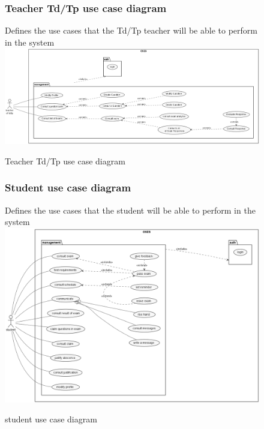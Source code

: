 \documentclass[]{uc2pfecaneva}
\begin{document}
    \begin{figure}
        \subsubsection{Teacher Td/Tp use case diagram}
        \raggedright{Defines the use cases that the Td/Tp teacher will be able to perform in the system}
        \linebreak
        \includegraphics[width=\textwidth]{images/TP_TD_Teacher}
        \caption{Teacher Td/Tp use case diagram}
    \end{figure}

    \begin{figure}
        \subsubsection{Student use case diagram}
        \raggedright{Defines the use cases that the student will be able to perform in the system}
        \linebreak
        \includegraphics[width=350pt]{images/student_UCD}
        \caption{student use case diagram}
    \end{figure}
\end{document}
